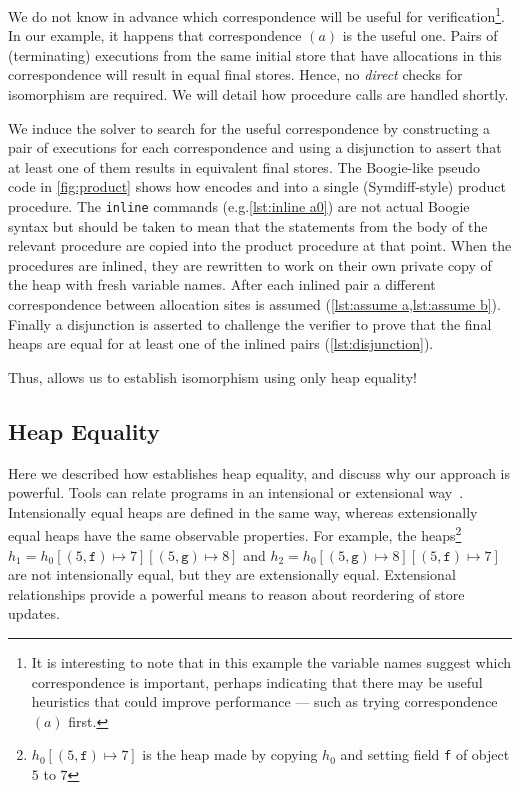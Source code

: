 \documentclass[runningheads,a4paper]{llncs}
\makeatletter
\newcommand*{\eg}{e.g.\@\xspace}
\makeatother
\begin{document}
We do not know in advance which correspondence will be useful for verification\footnote{It is interesting to note that in this example the variable names suggest which correspondence is important, perhaps indicating that there may be useful heuristics that could improve performance --- such as trying correspondence $(a)$ first.}. In our example, it happens that correspondence $(a)$ is the useful one. Pairs of (terminating) executions from the same initial store that have allocations in this correspondence will result in equal final stores. Hence, no \emph{direct} checks for isomorphism are required. We will detail how procedure calls are handled shortly.

We induce the solver to search for the useful correspondence by constructing a pair of executions for each correspondence and using a disjunction to assert that at least one of them results in equivalent final stores. The Boogie-like pseudo code in \cref{fig:product} shows how \tool{} encodes \copylr{} and \copyrl{} into a single (Symdiff-style) product procedure. The \texttt{inline} commands (\eg \cref{lst:inline a0}) are not actual Boogie syntax but should be taken to mean that the statements from the body of the relevant procedure are copied into the product procedure at that point. When the procedures are inlined, they are rewritten to work on their own private copy of the heap with fresh variable names. After each inlined pair a different correspondence between allocation sites is assumed (\cref{lst:assume a,lst:assume b}). Finally a disjunction is asserted to challenge the verifier to prove that the final heaps are equal for at least one of the inlined pairs (\cref{lst:disjunction}).

Thus, \metho{} allows us to establish isomorphism using only heap equality!

\subsection{Heap Equality}\label{sec:extensionality}

Here we described how \tool{} establishes heap equality, and discuss why our approach is powerful. Tools can relate programs in an intensional or extensional way~\cite{Benton2004}. Intensionally equal heaps are defined in the same way, whereas extensionally equal heaps have the same observable properties. For example, the heaps\footnote{$h_0[(5,\mathtt{f})\mapsto 7]$ is the heap made by copying $h_0$ and setting field \texttt{f} of object $5$ to $7$}  $h_1=h_0[(5,\mathtt{f}) \mapsto 7][(5,\mathtt{g}) \mapsto 8]$ and $h_2=h_0[(5,\mathtt{g}) \mapsto 8][(5,\mathtt{f}) \mapsto 7]$ are not intensionally equal, but they are extensionally equal. Extensional relationships provide a powerful means to reason about reordering of store updates.
\end{document}
